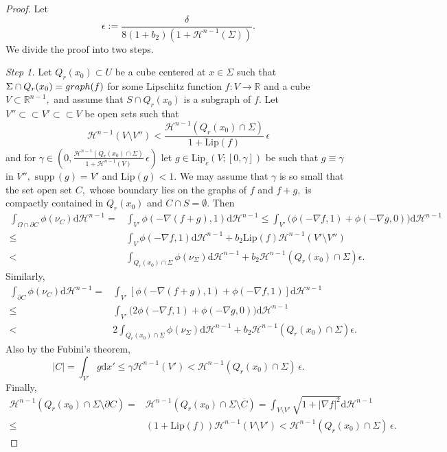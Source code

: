 \documentclass[10pt,a4paper]{amsart}
\newcommand{\Lip}{\mathrm{Lip}}
\newcommand{\R}{\mathbb{R}}
\newcommand{\bound}{b}
\newcommand{\cH}{\mathcal{H}}
\newcommand{\cl}[1]{\overline{#1}}
\newcommand{\p}{\partial}
\newcommand{\strictlyincluded}{\subset\subset}
\newcommand{\supp}{\mathrm{supp}\,}
\renewcommand{\d}{\mathrm{d}}
\begin{document}
\begin{proof}
Let 
$$
\epsilon:= \frac{\delta}{8(1+\bound_2)(1 + \cH^{n-1}(\Sigma))}.
$$
We divide the proof into two steps.

{\it Step 1.} Let $Q_r(x_0)\subset U$ be a cube centered at $x\in\Sigma$ such that $\Sigma\cap Q_r(x_0) = {\rm graph}(f)$ for some Lipschitz function $f:V\to\R$ and a cube $V\subset \R^{n-1},$ and assume that $S\cap Q_r(x_0)$ is a subgraph of $f.$ 
Let $V''\strictlyincluded V'\strictlyincluded V$ be open sets such that 
$$
\cH^{n-1}(V\setminus V'') < \frac{\cH^{n-1}(Q_r(x_0)\cap\Sigma)}{1 + \Lip(f)}\,\epsilon
$$ 
and for $\gamma\in(0,\frac{\cH^{n-1}(Q_r(x_0)\cap\Sigma)}{1+\cH^{n-1}(V)}\,\epsilon)$ let $g\in \Lip_c(V;[0,\gamma])$ be such that $g\equiv \gamma$ in $V'',$ $\supp(g)=V'$ and $\Lip(g)<1.$ We may assume that $\gamma$ is so small that the set open set $C,$ whose boundary lies on the graphs of $f$ and $f+g,$ is compactly contained in $Q_r(x_0)$ and $C\cap S=\emptyset.$
Then 
\begin{align*}
\int_{\Omega\cap \p C}  \phi(\nu_C)\d\cH^{n-1} = & \int_{V'} \phi(-\nabla(f+g),1)\d\cH^{n-1} \le 
\int_{V'} \Big(\phi(-\nabla f,1) + \phi(-\nabla g,0)\Big)\d\cH^{n-1} \\
\le & \int_{V} \phi(-\nabla f,1)\d\cH^{n-1} + \bound_2\Lip(f)\cH^{n-1}(V'\setminus V'')\\
< & \int_{Q_r(x_0)\cap\Sigma}\phi(\nu_\Sigma)\d\cH^{n-1} + \bound_2\cH^{n-1}(Q_r(x_0)\cap\Sigma)\epsilon.
\end{align*}
Similarly, 
\begin{align*}
\int_{\p C}  \phi(\nu_C)\d\cH^{n-1} = & \int_{V'} [\phi(-\nabla(f+g),1) + \phi(-\nabla f,1)]\d\cH^{n-1} \\
\le &  
\int_{V'} \Big(2\phi(-\nabla f,1) + \phi(-\nabla g,0)\Big)\d\cH^{n-1} \\
< & 2\int_{Q_r(x_0)\cap\Sigma}\phi(\nu_\Sigma)\d\cH^{n-1} + \bound_2\cH^{n-1}(Q_r(x_0)\cap\Sigma)\epsilon.
\end{align*}
%
Also by the Fubini's theorem,
$$
|C| = \int_{V'} g \d x'\le \gamma \cH^{n-1}(V') < \cH^{n-1}(Q_r(x_0)\cap\Sigma)\,\epsilon.
$$
Finally, 
$$
\begin{aligned}
\cH^{n-1}(Q_r(x_0)\cap\Sigma\setminus \p C) = & \cH^{n-1}(Q_r(x_0)\cap\Sigma\setminus \cl{C}) 
=\int_{V\setminus V'}\sqrt{1+|\nabla f|^2}\d \cH^{n-1}\\
\le & (1+\Lip(f)) \cH^{n-1}(V\setminus V') < \cH^{n-1}(Q_r(x_0)\cap\Sigma)\,\epsilon.
\end{aligned}
$$


\end{proof}
\end{document}
